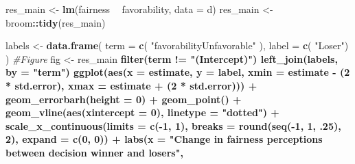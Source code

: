 \documentclass[]{book}
\newenvironment{Shaded}{\begin{snugshade}}{\end{snugshade}}
\newcommand{\KeywordTok}[1]{\textcolor[rgb]{0.13,0.29,0.53}{\textbf{#1}}}
\newcommand{\DataTypeTok}[1]{\textcolor[rgb]{0.13,0.29,0.53}{#1}}
\newcommand{\DecValTok}[1]{\textcolor[rgb]{0.00,0.00,0.81}{#1}}
\newcommand{\StringTok}[1]{\textcolor[rgb]{0.31,0.60,0.02}{#1}}
\newcommand{\CommentTok}[1]{\textcolor[rgb]{0.56,0.35,0.01}{\textit{#1}}}
\newcommand{\OperatorTok}[1]{\textcolor[rgb]{0.81,0.36,0.00}{\textbf{#1}}}
\newcommand{\NormalTok}[1]{#1}
\begin{document}
\begin{Shaded}
\begin{Highlighting}[]
\NormalTok{res_main <-}\StringTok{  }\KeywordTok{lm}\NormalTok{(fairness }\OperatorTok{~}\StringTok{ }\NormalTok{favorability, }\DataTypeTok{data =}\NormalTok{ d) }
\NormalTok{res_main <-}\StringTok{ }\NormalTok{broom}\OperatorTok{::}\KeywordTok{tidy}\NormalTok{(res_main)}

\NormalTok{labels <-}\StringTok{ }\KeywordTok{data.frame}\NormalTok{(}
  \DataTypeTok{term =} \KeywordTok{c}\NormalTok{(}
    \StringTok{"favorabilityUnfavorable"}
\NormalTok{  ),}
  \DataTypeTok{label =} \KeywordTok{c}\NormalTok{( }\StringTok{"Loser"}\NormalTok{)}
\NormalTok{)}
\CommentTok{#Figure}
\NormalTok{fig <-}\StringTok{   }\NormalTok{res_main }\OperatorTok{%>%}
\StringTok{  }\KeywordTok{filter}\NormalTok{(term }\OperatorTok{!=}\StringTok{ "(Intercept)"}\NormalTok{) }\OperatorTok{%>%}\StringTok{ }
\StringTok{  }\KeywordTok{left_join}\NormalTok{(labels, }\DataTypeTok{by =} \StringTok{"term"}\NormalTok{) }\OperatorTok{%>%}\StringTok{ }
\StringTok{  }
\StringTok{  }\KeywordTok{ggplot}\NormalTok{(}\KeywordTok{aes}\NormalTok{(}\DataTypeTok{x =}\NormalTok{ estimate, }\DataTypeTok{y =}\NormalTok{ label,}
             \DataTypeTok{xmin =}\NormalTok{ estimate }\OperatorTok{-}\StringTok{ }\NormalTok{(}\DecValTok{2} \OperatorTok{*}\StringTok{ }\NormalTok{std.error),}
             \DataTypeTok{xmax =}\NormalTok{ estimate }\OperatorTok{+}\StringTok{ }\NormalTok{(}\DecValTok{2} \OperatorTok{*}\StringTok{ }\NormalTok{std.error))) }\OperatorTok{+}
\StringTok{   }\KeywordTok{geom_errorbarh}\NormalTok{(}\DataTypeTok{height =} \DecValTok{0}\NormalTok{) }\OperatorTok{+}
\StringTok{  }\KeywordTok{geom_point}\NormalTok{() }\OperatorTok{+}
\StringTok{  }\KeywordTok{geom_vline}\NormalTok{(}\KeywordTok{aes}\NormalTok{(}\DataTypeTok{xintercept =} \DecValTok{0}\NormalTok{), }\DataTypeTok{linetype =} \StringTok{"dotted"}\NormalTok{) }\OperatorTok{+}
\StringTok{  }\KeywordTok{scale_x_continuous}\NormalTok{(}\DataTypeTok{limits =} \KeywordTok{c}\NormalTok{(}\OperatorTok{-}\DecValTok{1}\NormalTok{, }\DecValTok{1}\NormalTok{),}
                     \DataTypeTok{breaks =} \KeywordTok{round}\NormalTok{(}\KeywordTok{seq}\NormalTok{(}\OperatorTok{-}\DecValTok{1}\NormalTok{, }\DecValTok{1}\NormalTok{, .}\DecValTok{25}\NormalTok{), }\DecValTok{2}\NormalTok{),}
                     \DataTypeTok{expand =} \KeywordTok{c}\NormalTok{(}\DecValTok{0}\NormalTok{, }\DecValTok{0}\NormalTok{)) }\OperatorTok{+}
\StringTok{  }\KeywordTok{labs}\NormalTok{(}\DataTypeTok{x =} \StringTok{"Change in fairness perceptions between decision winner and losers"}\NormalTok{,}
}}}
\end{Highlighting}
\end{Shaded}
\end{document}
